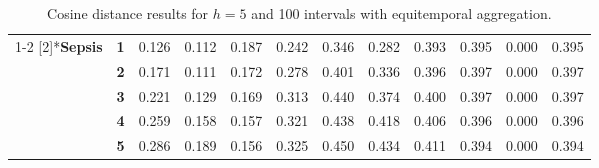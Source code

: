 \begin{table}[htbp]
\begin{tabular}{|cl|rrrrrrrrrr|}
\cmidrule{1-2}    \multirow{5}[2]{*}{\textbf{Sepsis}} & \textbf{1} & \cellcolor[rgb]{ .796,  .796,  .796}0.126 & \cellcolor[rgb]{ .804,  .804,  .804}0.112 & \cellcolor[rgb]{ .769,  .769,  .769}0.187 & \cellcolor[rgb]{ .745,  .745,  .745}0.242 & \cellcolor[rgb]{ .698,  .698,  .698}0.346 & \cellcolor[rgb]{ .729,  .729,  .729}0.282 & \cellcolor[rgb]{ .678,  .678,  .678}0.393 & \cellcolor[rgb]{ .678,  .678,  .678}0.395 & \cellcolor[rgb]{ .851,  .851,  .851}0.000 & \cellcolor[rgb]{ .678,  .678,  .678}0.395 \\
          & \textbf{2} & \cellcolor[rgb]{ .776,  .776,  .776}0.171 & \cellcolor[rgb]{ .804,  .804,  .804}0.111 & \cellcolor[rgb]{ .776,  .776,  .776}0.172 & \cellcolor[rgb]{ .729,  .729,  .729}0.278 & \cellcolor[rgb]{ .675,  .675,  .675}0.401 & \cellcolor[rgb]{ .702,  .702,  .702}0.336 & \cellcolor[rgb]{ .678,  .678,  .678}0.396 & \cellcolor[rgb]{ .678,  .678,  .678}0.397 & \cellcolor[rgb]{ .851,  .851,  .851}0.000 & \cellcolor[rgb]{ .678,  .678,  .678}0.397 \\
          & \textbf{3} & \cellcolor[rgb]{ .753,  .753,  .753}0.221 & \cellcolor[rgb]{ .796,  .796,  .796}0.129 & \cellcolor[rgb]{ .776,  .776,  .776}0.169 & \cellcolor[rgb]{ .714,  .714,  .714}0.313 & \cellcolor[rgb]{ .659,  .659,  .659}0.440 & \cellcolor[rgb]{ .686,  .686,  .686}0.374 & \cellcolor[rgb]{ .675,  .675,  .675}0.400 & \cellcolor[rgb]{ .678,  .678,  .678}0.397 & \cellcolor[rgb]{ .851,  .851,  .851}0.000 & \cellcolor[rgb]{ .678,  .678,  .678}0.397 \\
          & \textbf{4} & \cellcolor[rgb]{ .737,  .737,  .737}0.259 & \cellcolor[rgb]{ .784,  .784,  .784}0.158 & \cellcolor[rgb]{ .784,  .784,  .784}0.157 & \cellcolor[rgb]{ .71,  .71,  .71}0.321 & \cellcolor[rgb]{ .659,  .659,  .659}0.438 & \cellcolor[rgb]{ .667,  .667,  .667}0.418 & \cellcolor[rgb]{ .675,  .675,  .675}0.406 & \cellcolor[rgb]{ .678,  .678,  .678}0.396 & \cellcolor[rgb]{ .851,  .851,  .851}0.000 & \cellcolor[rgb]{ .678,  .678,  .678}0.396 \\
          & \textbf{5} & \cellcolor[rgb]{ .725,  .725,  .725}0.286 & \cellcolor[rgb]{ .769,  .769,  .769}0.189 & \cellcolor[rgb]{ .784,  .784,  .784}0.156 & \cellcolor[rgb]{ .71,  .71,  .71}0.325 & \cellcolor[rgb]{ .651,  .651,  .651}0.450 & \cellcolor[rgb]{ .659,  .659,  .659}0.434 & \cellcolor[rgb]{ .671,  .671,  .671}0.411 & \cellcolor[rgb]{ .678,  .678,  .678}0.394 & \cellcolor[rgb]{ .851,  .851,  .851}0.000 & \cellcolor[rgb]{ .678,  .678,  .678}0.394 \\
    \bottomrule
    \end{tabular}%
  \caption{Cosine distance results for $h=5$ and 100 intervals with equitemporal  aggregation.}
  \label{tab:equitemp_100}%
\end{table}%
